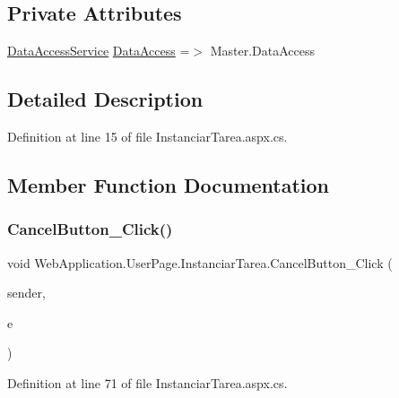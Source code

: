 \subsection*{Private Attributes}
\begin{DoxyCompactItemize}
\item 
\mbox{\hyperlink{classDataBaseAccess_1_1DataAccessService}{Data\+Access\+Service}} \mbox{\hyperlink{classWebApplication_1_1UserPage_1_1InstanciarTarea_a0d3588869feea14eebbb8baee638bd99}{Data\+Access}} =$>$ Master.\+Data\+Access
\end{DoxyCompactItemize}


\subsection{Detailed Description}


Definition at line 15 of file Instanciar\+Tarea.\+aspx.\+cs.



\subsection{Member Function Documentation}
\mbox{\label{classWebApplication_1_1UserPage_1_1InstanciarTarea_a852ce4236f997230e5bea7ece9cb0f06}} 
\subsubsection{\texorpdfstring{CancelButton\_Click()}{CancelButton\_Click()}}
{\footnotesize\ttfamily void Web\+Application.\+User\+Page.\+Instanciar\+Tarea.\+Cancel\+Button\+\_\+\+Click (\begin{DoxyParamCaption}\item[{object}]{sender,  }\item[{Event\+Args}]{e }\end{DoxyParamCaption})\hspace{0.3cm}{\ttfamily [protected]}}



Definition at line 71 of file Instanciar\+Tarea.\+aspx.\+cs.

\mbox{\label{classWebApplication_1_1UserPage_1_1InstanciarTarea_a2e38df38d916af37f9fc3f81b6e1dacb}} 
